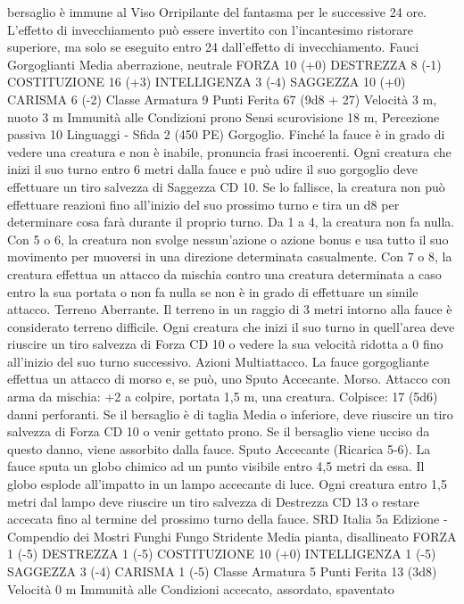 \begin{multicols}{2}
bersaglio è immune al Viso Orripilante del fantasma per le successive 24
ore. L’effetto di invecchiamento può essere invertito con l’incantesimo
ristorare superiore, ma solo se eseguito entro 24 dall’effetto di
invecchiamento.
Fauci Gorgoglianti
Media aberrazione, neutrale
FORZA 10 (+0)
DESTREZZA 8 (-1)
COSTITUZIONE 16 (+3)
INTELLIGENZA 3 (-4)
SAGGEZZA 10 (+0)
CARISMA 6 (-2)
Classe Armatura 9
Punti Ferita 67 (9d8 + 27)
Velocità 3 m, nuoto 3 m
Immunità alle Condizioni prono
Sensi scurovisione 18 m, Percezione passiva 10
Linguaggi -
Sfida 2 (450 PE)
Gorgoglio. Finché la fauce è in grado di vedere una creatura e
non è inabile, pronuncia frasi incoerenti. Ogni creatura che inizi
il suo turno entro 6 metri dalla fauce e può udire il suo gorgoglio
deve effettuare un tiro salvezza di Saggezza CD 10. Se lo
fallisce, la creatura non può effettuare reazioni fino all’inizio del
suo prossimo turno e tira un d8 per determinare cosa farà durante
il proprio turno. Da 1 a 4, la creatura non fa nulla. Con 5 o 6, la
creatura non svolge nessun’azione o azione bonus e usa tutto il
suo movimento per muoversi in una direzione determinata
casualmente. Con 7 o 8, la creatura effettua un attacco da
mischia contro una creatura determinata a caso entro la sua
portata o non fa nulla se non è in grado di effettuare un simile
attacco.
Terreno Aberrante. Il terreno in un raggio di 3 metri intorno alla
fauce è considerato terreno difficile. Ogni creatura che inizi il
suo turno in quell’area deve riuscire un tiro salvezza di Forza CD
10 o vedere la sua velocità ridotta a 0 fino all’inizio del suo turno
successivo.
Azioni
Multiattacco. La fauce gorgogliante effettua un attacco di morso
e, se può, uno Sputo Accecante.
Morso. Attacco con arma da mischia: +2 a colpire, portata 1,5
m, una creatura.
Colpisce: 17 (5d6) danni perforanti. Se il bersaglio è di taglia
Media o inferiore, deve riuscire un tiro salvezza di Forza CD 10
o venir gettato prono. Se il bersaglio viene ucciso da questo
danno, viene assorbito dalla fauce.
Sputo Accecante (Ricarica 5-6). La fauce sputa un globo
chimico ad un punto visibile entro 4,5 metri da essa. Il globo
esplode all’impatto in un lampo accecante di luce. Ogni creatura
entro 1,5 metri dal lampo deve riuscire un tiro salvezza di
Destrezza CD 13 o restare accecata fino al termine del prossimo
turno della fauce.
SRD Italia 5a Edizione - Compendio dei Mostri
Funghi
Fungo Stridente
Media pianta, disallineato
FORZA 1 (-5)
DESTREZZA 1 (-5)
COSTITUZIONE 10 (+0)
INTELLIGENZA 1 (-5)
SAGGEZZA 3 (-4)
CARISMA 1 (-5)
Classe Armatura 5
Punti Ferita 13 (3d8)
Velocità 0 m
Immunità alle Condizioni accecato, assordato, spaventato

\end{multicols}
